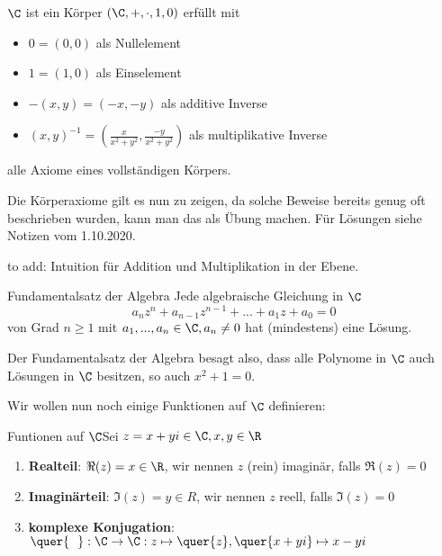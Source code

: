 \begin{satz}{$\C$ ist ein Körper}{}
$(\C, +, \cdot, 1, 0)$ erfüllt mit
\begin{itemize}
    \item $0 = (0,0)$ als Nullelement
    \item $1 = (1,0)$ als Einselement
    \item $-(x, y) = (-x, -y)$ als additive Inverse
    \item $(x, y)^{-1} = (\frac{x}{x^2+y^2}, \frac{-y}{x^2+y^2})$ als multiplikative Inverse
\end{itemize}
alle Axiome eines vollständigen Körpers.
\end{satz}

\begin{example}
Die Körperaxiome gilt es nun zu zeigen, da solche Beweise bereits genug oft beschrieben wurden, kann man das als Übung machen. Für Lösungen siehe Notizen vom 1.10.2020.
\end{example}

to add: Intuition für Addition und Multiplikation in der Ebene.



\begin{satz}{Fundamentalsatz der Algebra}{}
Jede algebraische Gleichung in $\C$
$$a_nz^n + a_{n-1}z^{n-1}+...+a_1z+a_0 = 0$$
von Grad $n\geq1$ mit $a_1,...,a_n \in \C, a_n\neq0$ hat (mindestens) eine Lösung.
\end{satz}
Der Fundamentalsatz der Algebra besagt also, dass alle Polynome in $\C$ auch Lösungen in $\C$ besitzen, so auch $x^2 + 1 = 0$.

Wir wollen nun noch einige Funktionen auf $\C$ definieren:

\begin{definition}{Funtionen auf $\C$}{}Sei $z = x + yi \in \C, x,y \in \R$
\begin{enumerate}
    \item \textbf{Realteil}: $\Re(z) = x \in \R$, wir nennen $z$ (rein) imaginär, falls $\Re(z)=0$
    \item \textbf{Imaginärteil}: $\Im(z) = y \in R$, wir nennen $z$ reell, falls $\Im(z)=0$
    \item \textbf{komplexe Konjugation}: $\quer{\ \ }: \C \to \C: z \mapsto \quer{z}, \quer{x+yi} \mapsto x-yi$
\end{enumerate}
\end{definition}

